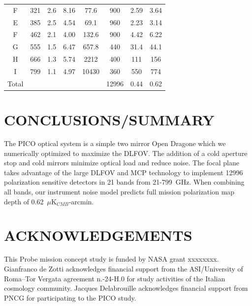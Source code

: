 \documentclass[]{spie}  %
\begin{document}
\begin{table}[ht]
\begin{tabular}{|c|c|c|c|c|c|c|c|}
F     & 321 & 2.6  & 8.16  & 77.6    & 900   & 2.59   & 3.64   \\
E     & 385 & 2.5  & 4.54  & 69.1    & 960   & 2.23   & 3.14   \\
F     & 462 & 2.1  & 4.00  & 132.6   & 900   & 4.42   & 6.22   \\
G     & 555 & 1.5  & 6.47  & 657.8   & 440   & 31.4  & 44.1  \\
H     & 666 & 1.3  & 5.74  & 2212    & 400   & 111 & 156 \\
I     & 799 & 1.1  & 4.97  & 10430   & 360   & 550 & 774 \\ 
\hline
Total &     &      &       &         & 12996 & 0.44   & 0.62  \\
\hline
\end{tabular}
\end{table}


\section{CONCLUSIONS/SUMMARY}

The PICO optical system is a simple two mirror Open Dragone which we numerically optimized to maximize the DLFOV.  The addition of a 
cold aperture stop and cold mirrors minimize optical load and reduce noise.  The focal plane takes advantage of the large DLFOV and MCP 
technology to implement 12996 polarization sensitive detectors in 21 bands from 21-799~GHz.  When combining all bands, our instrument 
noise model predicts full mission polarization map depth of 0.62~$\mu$K$_{CMB}$-arcmin.






\section{ACKNOWLEDGEMENTS}

This Probe mission concept study is funded by NASA grant xxxxxxxx.  Gianfranco de Zotti acknowledges financial support from the ASI/University of
Roma--Tor Vergata agreement n.-24-H.0 for study activities of the Italian cosmology community. Jacques
Delabrouille acknowledges financial support from PNCG for participating to the PICO study.


\end{document}

